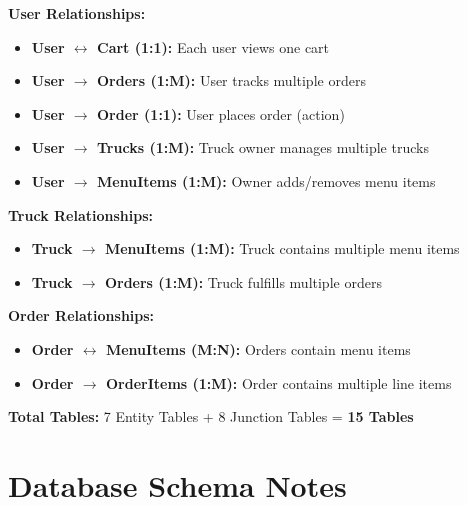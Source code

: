 \documentclass[11pt]{article}
\begin{document}
\begin{tcolorbox}[colback=white, colframe=darkgray, boxrule=1pt, arc=2mm, left=3mm]
\textbf{User Relationships:}
\begin{itemize}[leftmargin=1cm]
    \item \textbf{\color{primaryblue}User $\leftrightarrow$ Cart (1:1):} Each user views one cart
    \item \textbf{\color{primaryblue}User $\rightarrow$ Orders (1:M):} User tracks multiple orders
    \item \textbf{\color{primaryblue}User $\rightarrow$ Order (1:1):} User places order (action)
    \item \textbf{\color{primaryblue}User $\rightarrow$ Trucks (1:M):} Truck owner manages multiple trucks
    \item \textbf{\color{primaryblue}User $\rightarrow$ MenuItems (1:M):} Owner adds/removes menu items
\end{itemize}

\textbf{Truck Relationships:}
\begin{itemize}[leftmargin=1cm]
    \item \textbf{\color{primaryblue}Truck $\rightarrow$ MenuItems (1:M):} Truck contains multiple menu items
    \item \textbf{\color{primaryblue}Truck $\rightarrow$ Orders (1:M):} Truck fulfills multiple orders
\end{itemize}

\textbf{Order Relationships:}
\begin{itemize}[leftmargin=1cm]
    \item \textbf{\color{primaryblue}Order $\leftrightarrow$ MenuItems (M:N):} Orders contain menu items
    \item \textbf{\color{primaryblue}Order $\rightarrow$ OrderItems (1:M):} Order contains multiple line items
\end{itemize}

\textbf{Total Tables:} 7 Entity Tables + 8 Junction Tables = \textbf{15 Tables}
\end{tcolorbox}

\vspace{0.5cm}

\section{Database Schema Notes}
\end{document}
